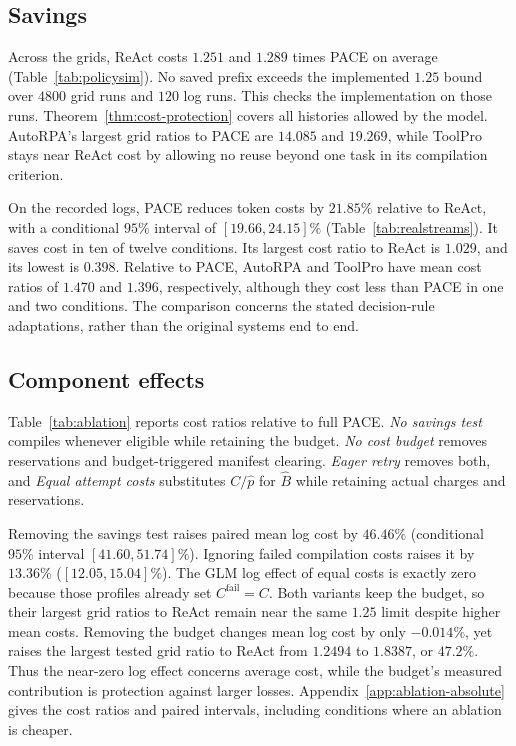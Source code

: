 \subsection{Savings}
\label{sec:regimes}
\label{sec:realstreams}

Across the grids, ReAct costs $1.251$ and $1.289$ times PACE on average (Table~\ref{tab:policysim}).
No saved prefix exceeds the implemented $1.25$ bound over $4800$ grid runs and $120$ log runs.
This checks the implementation on those runs.
Theorem~\ref{thm:cost-protection} covers all histories allowed by the model.
AutoRPA's largest grid ratios to PACE are $14.085$ and $19.269$, while ToolPro stays near ReAct cost by allowing no reuse beyond one task in its compilation criterion.



On the recorded logs, PACE reduces token costs by $21.85\%$ relative to ReAct, with a conditional $95\%$ interval of $[19.66,24.15]\%$ (Table~\ref{tab:realstreams}).
It saves cost in ten of twelve conditions.
Its largest cost ratio to ReAct is $1.029$, and its lowest is $0.398$.
Relative to PACE, AutoRPA and ToolPro have mean cost ratios of $1.470$ and $1.396$, respectively, although they cost less than PACE in one and two conditions.
The comparison concerns the stated decision-rule adaptations, rather than the original systems end to end.

\subsection{Component effects}
\label{sec:ablation}

Table~\ref{tab:ablation} reports cost ratios relative to full PACE.
\emph{No savings test} compiles whenever eligible while retaining the budget.
\emph{No cost budget} removes reservations and budget-triggered manifest clearing.
\emph{Eager retry} removes both, and \emph{Equal attempt costs} substitutes $C/\hat p$ for $\hat B$ while retaining actual charges and reservations.



Removing the savings test raises paired mean log cost by $46.46\%$ (conditional $95\%$ interval $[41.60,51.74]\%$).
Ignoring failed compilation costs raises it by $13.36\%$ ($[12.05,15.04]\%$).
The GLM log effect of equal costs is exactly zero because those profiles already set $C^{\mathrm{fail}}=C$.
Both variants keep the budget, so their largest grid ratios to ReAct remain near the same $1.25$ limit despite higher mean costs.
Removing the budget changes mean log cost by only $-0.014\%$, yet raises the largest tested grid ratio to ReAct from $1.2494$ to $1.8387$, or $47.2\%$.
Thus the near-zero log effect concerns average cost, while the budget's measured contribution is protection against larger losses.
Appendix~\ref{app:ablation-absolute} gives the cost ratios and paired intervals, including conditions where an ablation is cheaper.

